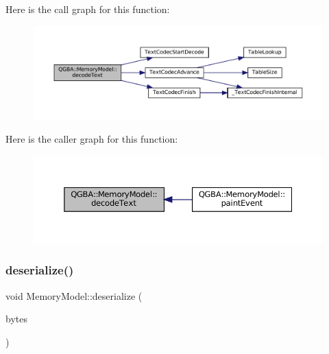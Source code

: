 Here is the call graph for this function\+:
\nopagebreak
\begin{figure}[H]
\begin{center}
\leavevmode
\includegraphics[width=350pt]{class_q_g_b_a_1_1_memory_model_a9638dd27a9e7aec61fe5c8850dd5b414_cgraph}
\end{center}
\end{figure}
Here is the caller graph for this function\+:
\nopagebreak
\begin{figure}[H]
\begin{center}
\leavevmode
\includegraphics[width=350pt]{class_q_g_b_a_1_1_memory_model_a9638dd27a9e7aec61fe5c8850dd5b414_icgraph}
\end{center}
\end{figure}
\mbox{\label{class_q_g_b_a_1_1_memory_model_acb68f33a2d203e814ed2588409080d05}} 
\subsubsection{\texorpdfstring{deserialize()}{deserialize()}}
{\footnotesize\ttfamily void Memory\+Model\+::deserialize (\begin{DoxyParamCaption}\item[{const Q\+Byte\+Array \&}]{bytes }\end{DoxyParamCaption})}

